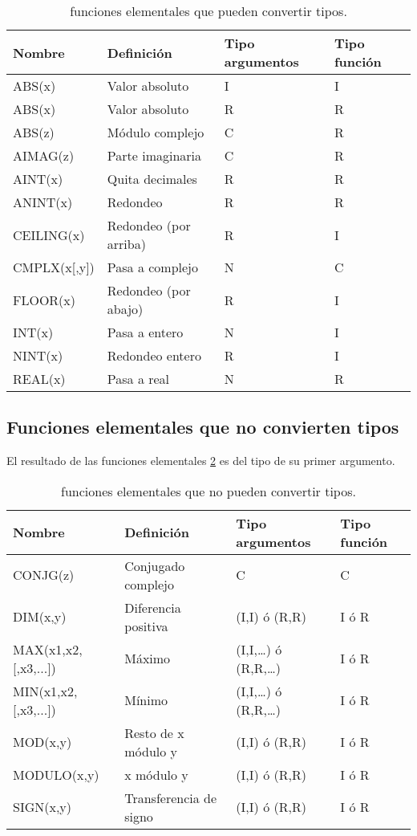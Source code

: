 \begin{table}[h!] \centering
	\begin{tabular}{l|l|l|l} 
	Nombre & Definición &  Tipo argumentos & Tipo función \\ \hline
	ABS(x) & Valor absoluto & I & I \\
	ABS(x) & Valor absoluto & R & R  \\
	ABS(z) & Módulo complejo & C & R \\
	AIMAG(z) & Parte imaginaria & C & R \\
	AINT(x) & Quita decimales &  R & R \\
	ANINT(x) & Redondeo & R & R \\
	CEILING(x) & Redondeo  (por arriba) &  R & I \\
	CMPLX(x[,y]) & Pasa a complejo & N  & C \\
	FLOOR(x) & Redondeo (por abajo) & R  & I \\
	INT(x) & Pasa a entero & N & I \\
	NINT(x) & Redondeo entero  & R  & I \\
	REAL(x) & Pasa a real & N & R \\
	\end{tabular}
	\caption{funciones elementales que pueden convertir tipos.}
	\label{Tab:01-03}
\end{table}

\subsection{Funciones elementales que no convierten tipos}


El resultado de las funciones elementales \ref{Tab:01-03} es del tipo de su primer argumento.

\begin{table}[h!] \centering
	\begin{tabular}{l|l|l|l}
		Nombre & Definición &  Tipo argumentos & Tipo función \\ \hline
		CONJG(z) & Conjugado complejo & C & C \\
		DIM(x,y) & Diferencia positiva & (I,I)  ó (R,R) & I ó R \\
		MAX(x1,x2,[,x3,...]) & Máximo & (I,I,…) ó (R,R,…)  & I ó R \\
		MIN(x1,x2,[,x3,...]) & Mínimo & (I,I,…) ó (R,R,…) & I ó R \\
		MOD(x,y) & Resto de x módulo y  & (I,I) ó (R,R) & I ó R \\
		MODULO(x,y)  & x módulo y & (I,I) ó (R,R) & I ó R \\ 
		SIGN(x,y) & Transferencia de signo & (I,I) ó (R,R) & I ó R \\
	\end{tabular}
	\caption{funciones elementales que no pueden convertir tipos.}
	\label{Tab:01-03}
\end{table}

